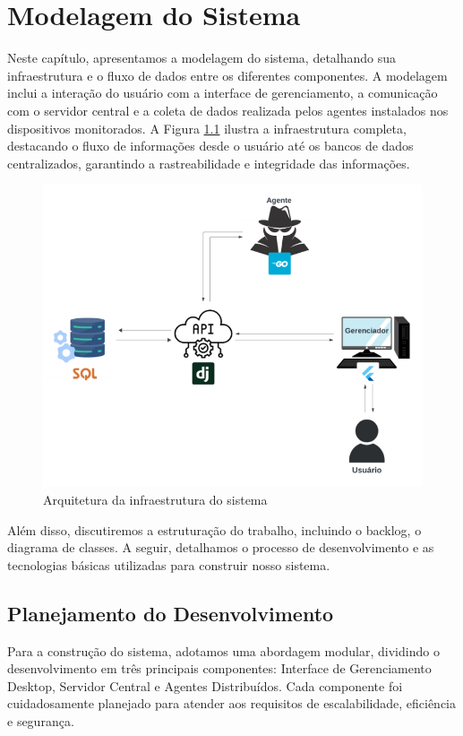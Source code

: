 \chapter{Modelagem do Sistema}

Neste capítulo, apresentamos a modelagem do sistema, detalhando sua infraestrutura e o fluxo de dados entre os diferentes componentes. A modelagem inclui a interação do usuário com a interface de gerenciamento, a comunicação com o servidor central e a coleta de dados realizada pelos agentes instalados nos dispositivos monitorados. A Figura \ref{fig:Infrasis1} ilustra a infraestrutura completa, destacando o fluxo de informações desde o usuário até os bancos de dados centralizados, garantindo a rastreabilidade e integridade das informações.


\begin{figure}[h]
    \centering
    \includegraphics[width=1\linewidth]{figuras/modelagemArc.png}
    \caption{Arquitetura da infraestrutura do sistema}
    \label{fig:Infrasis1}
\end{figure}
Além disso, discutiremos a estruturação do trabalho, incluindo o backlog, o diagrama de classes. A seguir, detalhamos o processo de desenvolvimento e as tecnologias básicas utilizadas para construir nosso sistema.

\section{Planejamento do Desenvolvimento}

Para a construção do sistema, adotamos uma abordagem modular, dividindo o desenvolvimento em três principais componentes: Interface de Gerenciamento Desktop, Servidor Central e Agentes Distribuídos. Cada componente foi cuidadosamente planejado para atender aos requisitos de escalabilidade, eficiência e segurança.  

